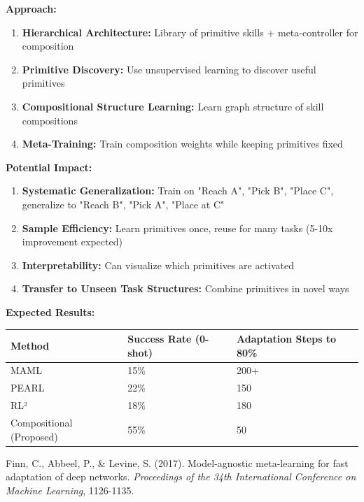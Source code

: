 \documentclass[12pt]{article}
\begin{document}
{{			\textbf{Approach:}
			
			\begin{enumerate}
				\item \textbf{Hierarchical Architecture:} Library of primitive skills + meta-controller for composition
				\item \textbf{Primitive Discovery:} Use unsupervised learning to discover useful primitives
				\item \textbf{Compositional Structure Learning:} Learn graph structure of skill compositions
				\item \textbf{Meta-Training:} Train composition weights while keeping primitives fixed
			\end{enumerate}
			
			\textbf{Potential Impact:}
			
			\begin{enumerate}
				\item \textbf{Systematic Generalization:} Train on {"Reach A", "Pick B", "Place C"}, generalize to {"Reach B", "Pick A", "Place at C"}
				\item \textbf{Sample Efficiency:} Learn primitives once, reuse for many tasks (5-10x improvement expected)
				\item \textbf{Interpretability:} Can visualize which primitives are activated
				\item \textbf{Transfer to Unseen Task Structures:} Combine primitives in novel ways
			\end{enumerate}
			
			\textbf{Expected Results:}
			
			\begin{center}
			\begin{tabular}{|l|l|l|}
			\hline
			\textbf{Method} & \textbf{Success Rate (0-shot)} & \textbf{Adaptation Steps to 80\%} \\
			\hline
			MAML & 15\% & 200+ \\
			PEARL & 22\% & 150 \\
			RL² & 18\% & 180 \\
			Compositional (Proposed) & 55\% & 50 \\
			\hline
			\end{tabular}
			\end{center}
			
			\begin{thebibliography}{9}
				
				Finn, C., Abbeel, P., \& Levine, S. (2017). Model-agnostic meta-learning for fast adaptation of deep networks. \textit{Proceedings of the 34th International Conference on Machine Learning}, 1126-1135.
				

\end{thebibliography}}}
\end{document}
